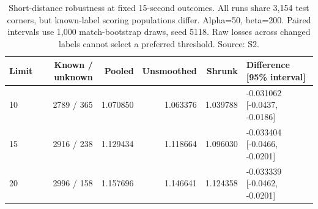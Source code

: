 \begin{table}[tbp]
\caption{Short-distance robustness at fixed 15-second outcomes. All runs share 3,154 test corners, but known-label scoring populations differ. Alpha=50, beta=200. Paired intervals use 1,000 match-bootstrap draws, seed 5118. Raw losses across changed labels cannot select a preferred threshold. Source: S2.}
\label{tab:short-threshold}
\centering
\normalsize
\setlength{\tabcolsep}{3.5pt}
\begin{tabular}{@{}lrrrrl@{}}
\toprule
Limit & Known / unknown & Pooled & Unsmoothed & Shrunk & Difference [95\% interval] \\
\midrule
10 & 2789 / 365 & 1.070850 & 1.063376 & 1.039788 & -0.031062 [-0.0437, -0.0186] \\
15 & 2916 / 238 & 1.129434 & 1.118664 & 1.096030 & -0.033404 [-0.0466, -0.0201] \\
20 & 2996 / 158 & 1.157696 & 1.146641 & 1.124358 & -0.033339 [-0.0462, -0.0201] \\
\bottomrule
\end{tabular}
\end{table}
